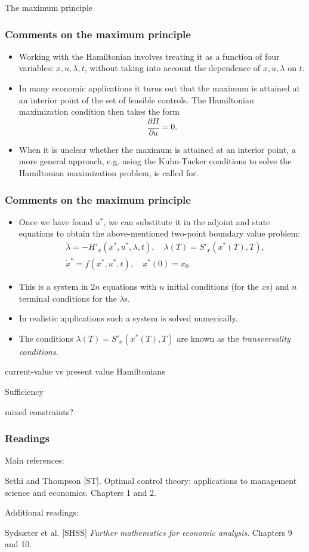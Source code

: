 \documentclass[10pt]{beamer}
\theoremstyle{definition}
\begin{document}
\begin{section}{The maximum principle}
\begin{frame}[fragile]
\frametitle{Comments on the maximum principle}
\begin{itemize}\itemsep1em
\item Working with the Hamiltonian involves treating it as a function of four variables: $ x,u,\lambda,t $, without taking into account the dependence of $ x,u,\lambda $ on $ t $.
\item In many economic applications it turns out that the maximum is attained at an interior point of the set of feasible controls. The Hamiltonian maximization condition then takes the form \[ \dfrac{\partial H}{\partial u} = 0. \]
\item When it is unclear whether the maximum is attained at an interior point, a more general approach, e.g. using the Kuhn-Tucker conditions to solve the Hamiltonian maximization problem, is called for.
\end{itemize}
\end{frame}

\begin{frame}[fragile]
\frametitle{Comments on the maximum principle}
\begin{itemize}\itemsep1em
\item Once we have found $ u^* $, we can substitute it in the adjoint and state equations to obtain the above-mentioned two-point boundary value problem:
\[ \begin{split}
&\dot{\lambda}  = -H'_x(x^*,u^*,\lambda,t),\quad  \lambda(T)=S'_x(x^*(T),T),\\
&\dot{x}^*  = f(x^*,u^*,t), \quad x^*(0)=x_0.
\end{split} \]
\item This is a system in $ 2n $ equations with $ n $ initial conditions (for the $ x $s)  and $ n $ terminal conditions for the $ \lambda $s.
\item In realistic applications such a system is solved numerically.
\item The conditions $ \lambda(T)=S'_x(x^*(T),T) $ are known as the \emph{transversality conditions}.
\end{itemize}
\end{frame}








current-value vs present value Hamiltonians

Sufficiency

mixed constraints?



\end{section}
\begin{frame}[fragile]
\frametitle{Readings}
Main references:

Sethi and Thompson [ST]. Optimal control theory: applications to management science and economics. Chapters 1 and 2.\bigskip

Additional readings:

Syds\ae{}ter et al. [SHSS] \emph{Further mathematics for economic analysis}. Chapters 9 and 10.

\end{frame}
\end{document}
